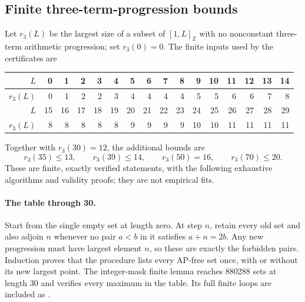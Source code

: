 \documentclass[11pt,a4paper]{article}
\theoremstyle{remark}
\newcommand{\Z}{\mathbb Z}
\begin{document}
\subsection{Finite three-term-progression bounds}\label{u86:sec:finiteAP}
Let $r_3(L)$ be the largest size of a subset of $[1,L]_{\Z}$ with no
nonconstant three-term arithmetic progression; set $r_3(0)=0$.
The finite inputs used by the certificates are
\begin{center}\small
\begin{tabular}{r|rrrrrrrrrrrrrrr}
\toprule
$L$&0&1&2&3&4&5&6&7&8&9&10&11&12&13&14\\\midrule
$r_3(L)$&0&1&2&2&3&4&4&4&4&5&5&6&6&7&8\\\midrule
$L$&15&16&17&18&19&20&21&22&23&24&25&26&27&28&29\\\midrule
$r_3(L)$&8&8&8&8&8&9&9&9&9&10&10&11&11&11&11\\\bottomrule
\end{tabular}
\end{center}
Together with $r_3(30)=12$, the additional bounds are
\begin{equation}\label{u86:eq:finiteAP}
 r_3(35)\le13,\qquad r_3(39)\le14,\qquad
 r_3(50)=16,\qquad r_3(70)\le20.
\end{equation}
These are finite, exactly verified statements, with the following
exhaustive algorithms and validity proofs; they are not empirical fits.

\paragraph{The table through 30.}
Start from the single empty set at length zero. At step $n$, retain
every old set and also adjoin $n$ whenever no pair $a<b$ in it satisfies
$a+n=2b$. Any new progression must have largest element $n$, so these
are exactly the forbidden pairs. Induction proves that the procedure
lists every AP-free set once, with or without its new largest point.
The integer-mask finite lemma reaches 880288 sets at length 30 and verifies
every maximum in the table. Its full finite loops are included as
.
\end{document}
